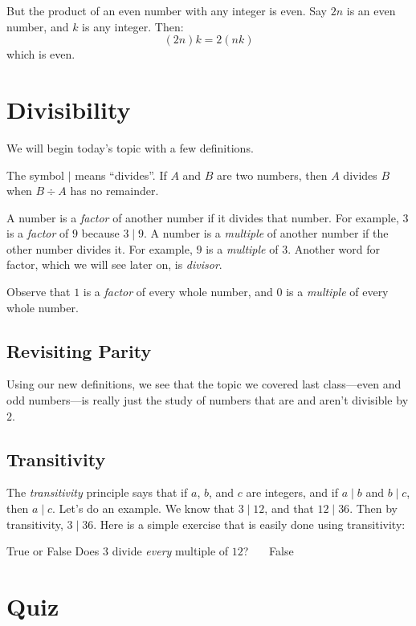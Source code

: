 \documentclass[a4paper,10pt]{report}
\begin{document}
But the product of an even number with any integer is even. Say $2n$ is an
even number, and $k$ is any integer. Then: \[
 (2n)k = 2(nk)
\] which is even.

\section{Divisibility}

We will begin today's topic with a few definitions.

The symbol $\mid$ means ``divides''. If $A$ and $B$ are two numbers, then $A$
divides $B$ when $B \div A$ has no remainder.

A number is a \emph{factor} of another number if it divides that number. For
example, $3$ is a \emph{factor} of $9$ because $3 \mid 9$. A number is a
\emph{multiple} of another number if the other number divides it. For example,
$9$ is a \emph{multiple} of $3$. Another word for factor, which we will see
later on, is \emph{divisor}.

Observe that $1$ is a \emph{factor} of every whole number, and $0$ is a
\emph{multiple} of every whole number.

\subsection{Revisiting Parity}

Using our new definitions, we see that the topic we covered last class---even
and odd numbers---is really just the study of numbers that are and aren't
divisible by $2$.

\subsection{Transitivity}

The \emph{transitivity} principle says that if $a$, $b$, and $c$ are integers,
and if $a \mid b$ and $b \mid c$, then $a \mid c$. Let's do an example. We know
that $3 \mid 12$, and that $12 \mid 36$. Then by transitivity, $3 \mid 36$. Here
is a simple exercise that is easily done using transitivity:

\begin{problem}{True or False}
 Does $3$ divide \emph{every} multiple of $12$? \hfill {}~~~False
\end{problem}

\section{Quiz}
\end{document}
